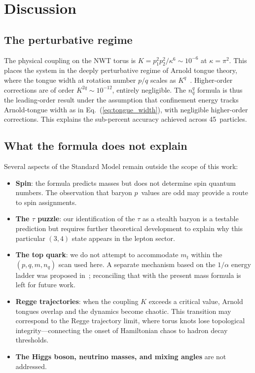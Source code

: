 \documentclass[11pt,a4paper]{article}
\begin{document}
\section{Discussion}
\label{sec:discussion}

\subsection{The perturbative regime}

The physical coupling on the NWT torus is $K = p_1^2 p_2^2 /
\kappa^6 \sim 10^{-6}$ at $\kappa = \pi^2$.  This places the
system in the deeply perturbative regime of Arnold tongue theory,
where the tongue width at rotation number $p/q$ scales as
$K^q$~\cite{Arnold}.  Higher-order corrections are of order
$K^{2q} \sim 10^{-12}$, entirely negligible.  The $n_q^q$ formula
is thus the leading-order result under the assumption that
confinement energy tracks Arnold-tongue width as in
Eq.~(\ref{eq:tongue_width}), with negligible higher-order
corrections.  This explains the sub-percent accuracy achieved
across 45~particles.

\subsection{What the formula does not explain}

Several aspects of the Standard Model remain outside the scope of
this work:
\begin{itemize}
  \item \textbf{Spin}: the formula predicts masses but does not
    determine spin quantum numbers.  The observation that baryon
    $p$~values are odd may provide a route to spin assignments.
  \item \textbf{The $\tau$ puzzle}: our identification of the $\tau$
    as a stealth baryon is a testable prediction but requires
    further theoretical development to explain why this particular
    $(3,4)$ state appears in the lepton sector.
  \item \textbf{The top quark}: we do not attempt to accommodate
    $m_t$ within the $(p,q,m,n_q)$ scan used here.  A separate
    mechanism based on the $1/\alpha$ energy ladder was proposed
    in~\cite{paper4}; reconciling that with the present mass formula
    is left for future work.
  \item \textbf{Regge trajectories}: when the coupling $K$ exceeds a
    critical value, Arnold tongues overlap and the dynamics become
    chaotic.  This transition may correspond to the Regge trajectory
    limit, where torus knots lose topological integrity---connecting
    the onset of Hamiltonian chaos to hadron decay thresholds.
  \item \textbf{The Higgs boson, neutrino masses, and mixing angles}
    are not addressed.
\end{itemize}
\end{document}
